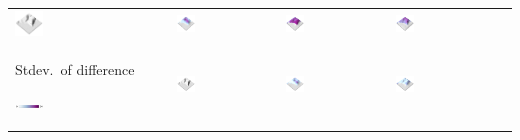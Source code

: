 \documentclass[prodmode,acmtochi]{acmsmall} %
\begin{document}
\begin{table}
{\begin{tabular}{m{} m{} m{} m{} m{}}
\includegraphics[width=0.19\textwidth]{images/render_3d/participants/dem_difference_1.png} &
\includegraphics[width=0.19\textwidth]{images/render_3d/participants/stdev_dem_1.png} &
\includegraphics[width=0.19\textwidth]{images/render_3d/participants/stdev_dem_2.png} &
\includegraphics[width=0.19\textwidth]{images/render_3d/participants/stdev_dem_3.png}\\
%
Stdev.~of difference \par \vspace{0.5em} \includegraphics[width=0.19\textwidth]{images/legends/stdev_diff_legend.pdf} & 
\includegraphics[width=0.19\textwidth]{images/render_3d/participants/dem_difference_1.png} &
\includegraphics[width=0.19\textwidth]{images/render_3d/participants/stdev_regression_difference_series_1.png} &
\includegraphics[width=0.19\textwidth]{images/render_3d/participants/stdev_regression_difference_series_2.png} &

\end{tabular}}
\end{table}
\end{document}
